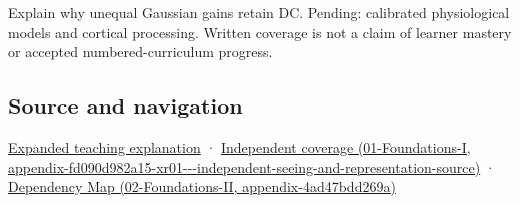 Explain why unequal Gaussian gains retain DC. Pending: calibrated physiological models and cortical processing. Written coverage is not a claim of learner mastery or accepted numbered-curriculum progress.

\subsection{Source and navigation}\label{appendix-7281c15ac44a-source-and-navigation}

\href{Continuous\%20Notes/University\%20-\%20Worlds,\%20Images\%20and\%20Inference\%20-\%20Graphics,\%20Vision\%20and\%20Photography\#The\%20eye\%20is\%20an\%20optical\%20instrument\%20with\%20neural\%20processing\%20inside\%20it}{Expanded teaching explanation} · \href{../01-Foundations-I/main.pdf\#nameddest=appendix-fd090d982a15-xr01---independent-seeing-and-representation-source}{Independent coverage (01-Foundations-I, appendix-fd090d982a15-xr01-\/-\/-independent-seeing-and-representation-source)} · \href{../02-Foundations-II/main.pdf\#nameddest=appendix-4ad47bdd269a}{Dependency Map (02-Foundations-II, appendix-4ad47bdd269a)}

